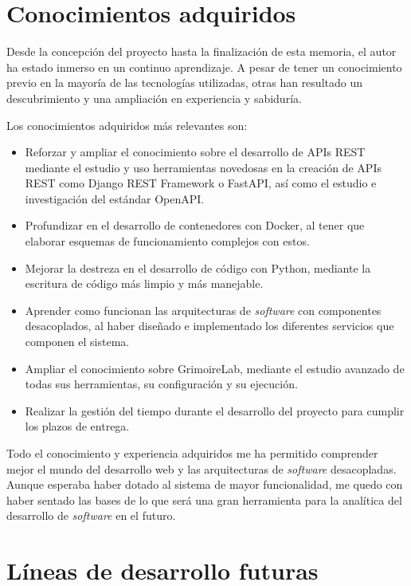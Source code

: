 \section{Conocimientos adquiridos}

Desde la concepción del proyecto hasta la finalización de esta memoria, el autor ha estado inmerso en un continuo aprendizaje. A pesar de tener un conocimiento previo en la mayoría de las tecnologías utilizadas, otras han resultado un descubrimiento y una ampliación en experiencia y sabiduría.

Los conocimientos adquiridos más relevantes son:

\begin{itemize}
    \item Reforzar y ampliar el conocimiento sobre el desarrollo de APIs REST mediante el estudio y uso herramientas novedosas en la creación de APIs REST como Django REST Framework o FastAPI, así como el estudio e investigación del estándar OpenAPI.
    \item Profundizar en el desarrollo de contenedores con Docker, al tener que elaborar esquemas de funcionamiento complejos con estos.
    \item Mejorar la destreza en el desarrollo de código con Python, mediante la escritura de código más limpio y más manejable.
    \item Aprender como funcionan las arquitecturas de \emph{software} con componentes desacoplados, al haber diseñado e implementado los diferentes servicios que componen el sistema.
    \item Ampliar el conocimiento sobre GrimoireLab, mediante el estudio avanzado de todas sus herramientas, su configuración y su ejecución.
    \item Realizar la gestión del tiempo durante el desarrollo del proyecto para cumplir los plazos de entrega.
\end{itemize}

Todo el conocimiento y experiencia adquiridos me ha permitido comprender mejor el mundo del desarrollo web y las arquitecturas de \emph{software} desacopladas. Aunque esperaba haber dotado al sistema de mayor funcionalidad, me quedo con haber sentado las bases de lo que será una gran herramienta para la analítica del desarrollo de \emph{software} en el futuro.


\section{Líneas de desarrollo futuras}

